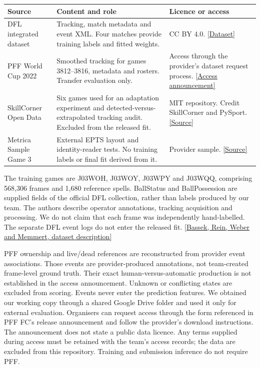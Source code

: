 \documentclass[10pt,a4paper]{article}
\begin{document}
\begin{tabularx}{\textwidth}{@{}>{\raggedright\arraybackslash}p{3.1cm}L>{\raggedright\arraybackslash}p{4.3cm}@{}}
\toprule
\textbf{Source} & \textbf{Content and role} & \textbf{Licence or access}\\
\midrule
DFL integrated dataset & Tracking, match metadata and event XML. Four matches provide training labels
and fitted weights. & CC BY 4.0. \href{https://doi.org/10.6084/m9.figshare.28196177}{[Dataset]}\\
PFF World Cup 2022 & Smoothed tracking for games 3812--3816, metadata and rosters. Transfer evaluation
only. & Access through the provider's dataset request process.
\href{https://www.blog.fc.pff.com/blog/pff-fc-release-2022-world-cup-data}{[Access announcement]}\\
SkillCorner Open Data & Six games used for an adaptation experiment and detected-versus-extrapolated
tracking audit. Excluded from the released fit. & MIT repository. Credit SkillCorner and PySport.
\href{https://github.com/SkillCorner/opendata}{[Source]}\\
Metrica Sample Game 3 & External EPTS layout and identity-reader tests. No training labels or final fit
derived from it. & Provider sample. \href{https://github.com/metrica-sports/sample-data}{[Source]}\\
\bottomrule
\end{tabularx}

The training games are J03WOH, J03WOY, J03WPY and J03WQQ, comprising 568,306 frames and 1,680 reference
spells. BallStatus and BallPossession are supplied fields of the official DFL collection, rather than
labels produced by our team. The authors describe operator annotations, tracking acquisition and
processing. We do not claim that each frame was independently hand-labelled. The separate DFL event logs
do not enter the released fit.
\href{https://doi.org/10.1038/s41597-025-04505-y}{[Bassek, Rein, Weber and Memmert, dataset description]}

PFF ownership and live/dead references are reconstructed from provider event associations. Those events
are provider-produced annotations, not team-created frame-level ground truth. Their exact
human-versus-automatic production is not established in the access announcement. Unknown or conflicting
states are excluded from scoring. Events never enter the prediction features. We obtained our working copy
through a shared Google Drive folder and used it only for external evaluation. Organisers can request
access through the form referenced in PFF FC's release announcement and follow the provider's download
instructions. The announcement does not state a public data licence. Any terms supplied during access
must be retained with the team's access records; the data are excluded from this repository. Training
and submission inference do not require PFF.
\end{document}
